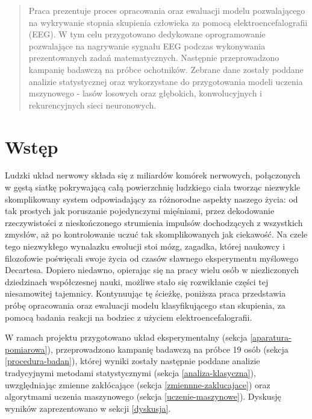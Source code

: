 \documentclass{./assets/wfis}
\begin{document}

\stronatytulowa

\begin{abstract}
Praca prezentuje proces opracowania oraz ewaluacji modelu pozwalającego na wykrywanie stopnia skupienia człowieka za pomocą elektroencefalografii (EEG). W tym celu przygotowano dedykowane oprogramowanie pozwalające na nagrywanie sygnału EEG podczas wykonywania prezentowanych zadań matematycznych. Następnie przeprowadzono kampanię badawczą na próbce ochotników. Zebrane dane zostały poddane analizie statystycznej oraz wykorzystane do przygotowania modeli uczenia mszynowego - lasów losowych oraz głębokich, konwolucyjnych i rekurencyjnych sieci neuronowych.
\end{abstract}

\chapter{Wstęp}
Ludzki układ nerwowy składa się z miliardów komórek nerwowych, połączonych w gęstą siatkę pokrywającą całą powierzchnię ludzkiego ciała tworząc niezwykle skomplikowany system odpowiadający za różnorodne aspekty naszego życia: od tak prostych jak poruszanie pojedynczymi mięśniami, przez dekodowanie rzeczywistości z nieskończonego strumienia impulsów dochodzących z wszystkich zmysłów, aż po kontrolowanie uczuć tak skomplikowanych jak ciekawość. Na czele tego niezwykłego wynalazku ewolucji stoi mózg, zagadka, której naukowcy i filozofowie poświęcali swoje życia od czasów sławnego eksperymentu myślowego Decartesa. Dopiero niedawno, opierając się na pracy wielu osób w niezliczonych dziedzinach współczesnej nauki, możliwe stało się rozwikłanie części tej niesamowitej tajemnicy. Kontynuując tę ścieżkę, poniższa praca przedstawia próbę opracowania oraz ewaluacji modelu klasyfikującego stan skupienia, za pomocą badania reakcji na bodziec z użyciem elektroencefalografii. 

W ramach projektu przygotowano układ eksperymentalny (sekcja \ref{aparatura-pomiarowa}), przeprowadzono kampanię badawczą na próbce 19 osób (sekcja \ref{procedura-badan}), której wyniki zostały następnie poddane analizie tradycyjnymi metodami statystycznymi (sekcja \ref{analiza-klasyczna}), uwzględniając zmienne zakłócające (sekcja \ref{zmiennne-zaklucajace}) oraz algorytmami uczenia maszynowego (sekcja \ref{uczenie-maszynowe}). Dyskusję wyników zaprezentowano w sekcji \ref{dyskusja}.
\end{document}
